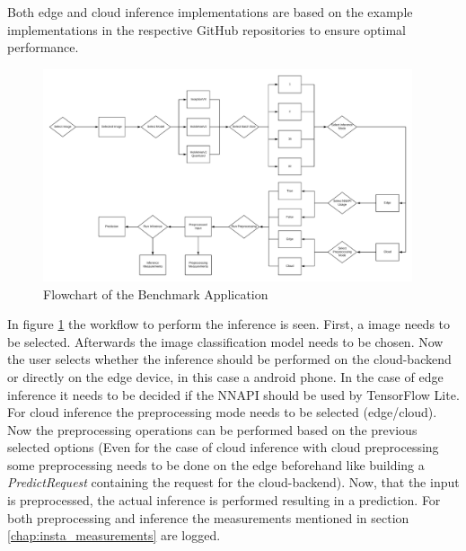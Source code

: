 Both edge and cloud inference implementations are based on the example implementations in the respective GitHub repositories to ensure optimal performance. 


\begin{figure}[htb]
\centering
\includegraphics[width=0.97\textwidth]{./Bilder/FlowChart_App.png}
\caption{Flowchart of the Benchmark Application}
\label{fig:app}
\end{figure}
In figure \ref{fig:app} the workflow to perform the inference is seen. First, a image needs to be selected. Afterwards the image classification model needs to be chosen. Now the user selects whether the inference should be performed on the cloud-backend or directly on the edge device, in this case a android phone. In the case of edge inference it needs to be decided if the NNAPI should be used by TensorFlow Lite. For cloud inference the preprocessing mode needs to be selected (edge/cloud). Now the preprocessing operations can be performed based on the previous selected options (Even for the case of cloud inference with cloud preprocessing some preprocessing needs to be done on the edge beforehand like building a \emph{PredictRequest} containing the request for the cloud-backend). Now, that the input is preprocessed, the actual inference is performed resulting in a prediction. For both preprocessing and inference the measurements mentioned in section \ref{chap:insta_measurements} are logged.

